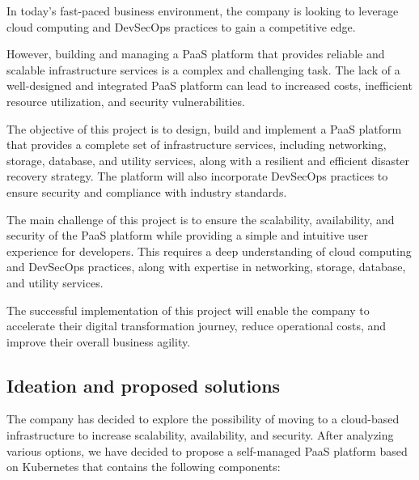 In today's fast-paced business environment, the company is looking to leverage cloud computing and DevSecOps practices to gain a competitive edge.  

However, building and managing a PaaS platform that provides reliable and scalable infrastructure services is a complex and challenging task. The lack of a well-designed and integrated PaaS platform can lead to increased costs, inefficient resource utilization, and security vulnerabilities. 

The objective of this project is to design, build and implement a PaaS platform that provides a complete set of infrastructure services, including networking, storage, database, and utility services, along with a resilient and efficient disaster recovery strategy. The platform will also incorporate DevSecOps practices to ensure security and compliance with industry standards. 

The main challenge of this project is to ensure the scalability, availability, and security of the PaaS platform while providing a simple and intuitive user experience for developers. This requires a deep understanding of cloud computing and DevSecOps practices, along with expertise in networking, storage, database, and utility services. 

The successful implementation of this project will enable the company to accelerate their digital transformation journey, reduce operational costs, and improve their overall business agility. 

 

\subsection{Ideation and proposed solutions} 

The company has decided to explore the possibility of moving to a cloud-based infrastructure to increase scalability, availability, and security. After analyzing various options, we have decided to propose a self-managed PaaS platform based on Kubernetes that contains the following components: 

